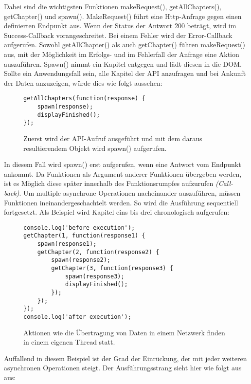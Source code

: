 \noindent
Dabei sind die wichtigsten Funktionen makeRequest(), getAllChapters(), getChapter() und spawn(). MakeRequest() führt eine Http-Anfrage gegen einen definierten Endpunkt aus. Wenn der Status der Antwort 200 beträgt, wird im Success-Callback vorangeschreitet. Bei einem Fehler wird der Error-Callback aufgerufen. Sowohl getAllChapter() als auch getChapter() führen makeRequest() aus, mit der Möglichkeit im Erfolgs- und im Fehlerfall der Anfrage eine Aktion auszuführen. Spawn() nimmt ein Kapitel entgegen und lädt diesen in die DOM. Sollte ein Anwendungsfall sein, alle Kapitel der API anzufragen und bei Ankunft der Daten anzuzeigen, würde dies wie folgt aussehen:

\begin{figure}[H]
\begin{lstlisting}[basicstyle=\small]
getAllChapters(function(response) {
    spawn(response);
    displayFinished();
});
\end{lstlisting}
\caption{Zuerst wird der API-Aufruf ausgeführt und mit dem daraus resultierendem Objekt wird spawn() aufgerufen.}
\end{figure}

\noindent
In diesem Fall wird spawn() erst aufgerufen, wenn eine Antwort vom Endpunkt ankommt. Da Funktionen als Argument anderer Funktionen übergeben werden, ist es Möglich diese \glqq{}später\grqq{} innerhalb des Funktionsrumpfes aufzurufen \textit{(\glqq{}Call-back\grqq{})}. Um multiple asynchrone Operationen nacheinander auszuführen, müssen Funktionen ineinandergeschachtelt werden. So wird die Ausführung sequentiell fortgesetzt. Als Beispiel wird Kapitel eins bis drei chronologisch aufgerufen:

\begin{figure}[H]
\begin{lstlisting}[basicstyle=\small]
console.log('before execution');
getChapter(1, function(response1) {
    spawn(response1);
    getChapter(2, function(response2) {
        spawn(response2);
        getChapter(3, function(response3) {
            spawn(response3);
            displayFinished();
        });
    });
});
console.log('after execution');
\end{lstlisting}
\caption{Aktionen wie die Übertragung von Daten in einem Netzwerk finden in einem eigenen Thread statt.}
\end{figure}

\noindent
Auffallend in diesem Beispiel ist der Grad der Einrückung, der mit jeder weiteren asynchronen Operationen steigt. Der Ausführungsstrang sieht hier wie folgt aus aus:

